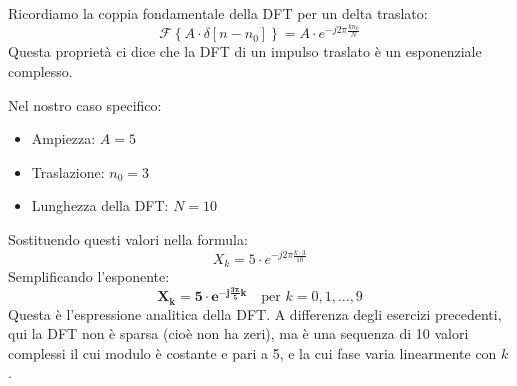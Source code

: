 \begin{soluzione}{14}
\begin{enumerate}
        Ricordiamo la coppia fondamentale della DFT per un delta traslato:
        \[
            \mathcal{F}\left\{ A \cdot \delta[n - n_0] \right\} = A \cdot e^{-j2\pi\frac{k n_0}{N}}
        \]
        Questa proprietà ci dice che la DFT di un impulso traslato è un esponenziale complesso.
        
        Nel nostro caso specifico:
        \begin{itemize}
            \item Ampiezza: $A = 5$
            \item Traslazione: $n_0 = 3$
            \item Lunghezza della DFT: $N = 10$
        \end{itemize}
        Sostituendo questi valori nella formula:
        \[
            X_k = 5 \cdot e^{-j2\pi\frac{k \cdot 3}{10}}
        \]
        Semplificando l'esponente:
        \[
            \mathbf{X_k = 5 \cdot e^{-j\frac{3\pi}{5}k}} \quad \text{per } k = 0, 1, \dots, 9
        \]
        Questa è l'espressione analitica della DFT. A differenza degli esercizi precedenti, qui la DFT non è sparsa (cioè non ha zeri), ma è una sequenza di 10 valori complessi il cui modulo è costante e pari a 5, e la cui fase varia linearmente con $k$.
    \end{enumerate}
\end{soluzione}